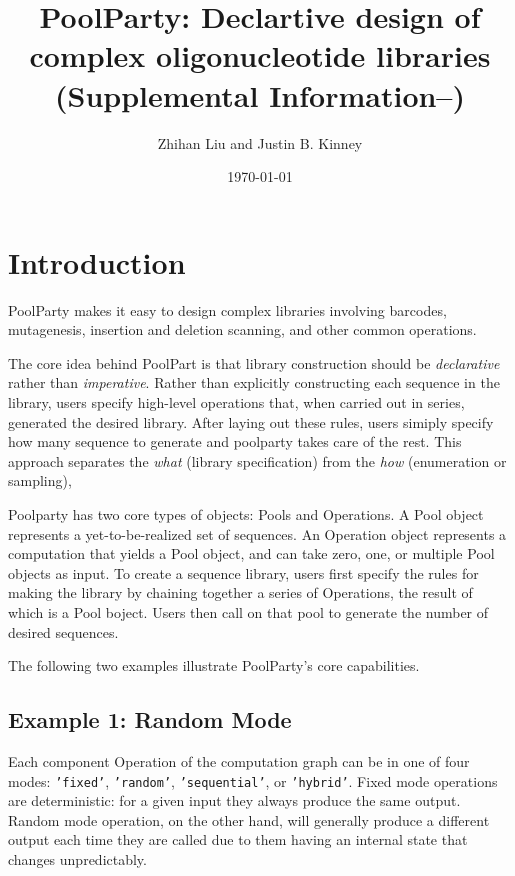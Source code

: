 \documentclass[11pt]{article}
\title{PoolParty: Declartive design of complex oligonucleotide libraries\\
(Supplemental Information--)}
\author{Zhihan Liu and Justin B. Kinney}
\date{\today}
\newcommand{\inpy}[1]{\texttt{#1}}
\begin{document}
\maketitle

\tableofcontents
\newpage


\section{Introduction}
\label{sec:introduction}

PoolParty makes it easy to design complex libraries involving barcodes, mutagenesis, insertion and deletion scanning, and other common operations. 

The core idea behind PoolPart is that library construction should be \emph{declarative} rather than \emph{imperative}. Rather than explicitly constructing each sequence in the library, users specify high-level operations that, when carried out in series, generated the desired library. After laying out these rules, users simiply specify how many sequence to generate and poolparty takes care of the rest. This approach separates the \emph{what} (library specification) from the \emph{how} (enumeration or sampling), 

Poolparty has two core types of objects: Pools and Operations. A Pool object represents a yet-to-be-realized set of sequences. An Operation object represents a computation that yields a Pool object, and can take zero, one, or multiple Pool objects as input.  To create a sequence library, users first specify the rules for making the library by chaining together a series of Operations, the result of which is a Pool boject. Users then call on that pool to generate the number of desired sequences. 

The following two examples illustrate PoolParty's core capabilities.

\subsection{Example 1: Random Mode}
\label{subsec:example-random}

Each component Operation of the computation graph can be in one of four modes: \inpy{'fixed'}, \inpy{'random'}, \inpy{'sequential'}, or \inpy{'hybrid'}.  Fixed mode operations are deterministic: for a given input they always produce the same output. Random mode operation, on the other hand, will generally produce a different output each time they are called due to them having an internal state that changes unpredictably. 
\end{document}
